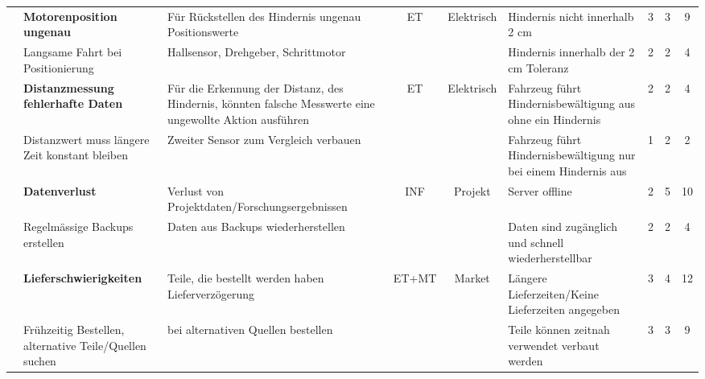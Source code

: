 \documentclass[../main.tex]{subfiles}
\begin{document}
\begin{landscape}
\begin{longtable}{|c|p{4.5cm}|p{5cm}|c|c|p{4.5cm}|c|c|c|}
\rowcolor[HTML]{F5F5F5} & \textbf{Motorenposition ungenau} & Für Rückstellen des Hindernis ungenau Positionswerte & ET & Elektrisch & Hindernis nicht innerhalb 2 cm & 3 & 3 & \cellcolor[HTML]{FFFF66}9 \\* \cline{2-3} \cline{6-9}
\rowcolor[HTML]{F5F5F5} \multirow{-2}{*}{R3} & Langsame Fahrt bei Positionierung & Hallsensor, Drehgeber, Schrittmotor & & & Hindernis innerhalb der 2 cm Toleranz & 2 & 2 & \cellcolor[HTML]{CCFF33}4 \\ \hline

\rowcolor{white} & \textbf{Distanzmessung fehlerhafte Daten} & Für die Erkennung der Distanz, des Hindernis, könnten falsche Messwerte eine ungewollte Aktion ausführen & ET & Elektrisch & Fahrzeug führt Hindernisbewältigung aus ohne ein Hindernis & 2 & 2 & \cellcolor[HTML]{CCFF33}4 \\* \cline{2-3} \cline{6-9}
\rowcolor{white} \multirow{-2}{*}{R4} & Distanzwert muss längere Zeit konstant bleiben & Zweiter Sensor zum Vergleich verbauen & & & Fahrzeug führt Hindernisbewältigung nur bei einem Hindernis aus & 1 & 2 & \cellcolor[HTML]{00CC00}2 \\ \hline

\rowcolor[HTML]{F5F5F5} & \textbf{Datenverlust} & Verlust von Projektdaten/Forschungsergebnissen & INF & Projekt & Server offline & 2 & 5 & \cellcolor[HTML]{FFC000}10 \\* \cline{2-3} \cline{6-9}
\rowcolor[HTML]{F5F5F5} \multirow{-2}{*}{R5} & Regelmässige Backups erstellen & Daten aus Backups wiederherstellen & & & Daten sind zugänglich und schnell wiederherstellbar & 2 & 2 & \cellcolor[HTML]{CCFF33}4 \\ \hline

\rowcolor{white} & \textbf{Lieferschwierigkeiten} & Teile, die bestellt werden haben Lieferverzögerung & ET+MT &  Market & Längere Lieferzeiten/Keine Lieferzeiten angegeben & 3 & 4 & \cellcolor[HTML]{FFC000}12 \\* \cline{2-3} \cline{6-9}
\rowcolor{white} \multirow{-2}{*}{R6} & Frühzeitig Bestellen, alternative Teile/Quellen suchen & bei alternativen Quellen bestellen & & & Teile können zeitnah verwendet verbaut werden & 3 & 3 & \cellcolor[HTML]{FFFF66}9 \\ \hline


\end{longtable}
\end{landscape}
\end{document}
